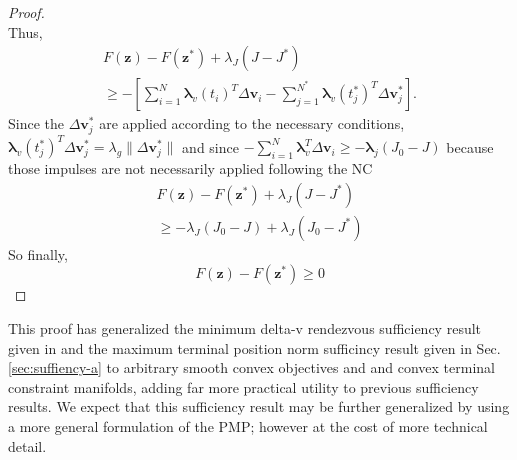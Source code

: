 \documentclass[letterpaper, 10 pt, conference]{ieeeconf}  %
\begin{document}
\begin{proof}
\[\]
Thus,
\begin{equation}
\begin{gathered}
F(\boldsymbol{z})-F(\boldsymbol{z}^*)+\lambda_J(J-J^*)\\
\geq-\left[\sum_{i=1}^{N}\boldsymbol{\lambda}_v(t_i)^T\Delta\boldsymbol{v}_i
-\sum_{j=1}^{N^*}\boldsymbol{\lambda}_v(t_j^*)^T\Delta\boldsymbol{v}_j^*\right].
\end{gathered}
\end{equation}
Since the $\Delta\boldsymbol{v}_j^*$ are applied according to the necessary conditions, $\boldsymbol{\lambda}_v(t_j^*)^T\Delta\boldsymbol{v}_j^* = \lambda_g\|\Delta\boldsymbol{v}_j^*\|$ and since $- \sum_{i=1}^N \boldsymbol{\lambda}_v^T \Delta \boldsymbol{v}_i \geq - \boldsymbol{\lambda}_j (J_0 - J)$ because those impulses are not necessarily applied following the NC
\begin{equation}
\begin{gathered}
F(\boldsymbol{z})-F(\boldsymbol{z}^*)+\lambda_J(J-J^*)\\
\geq-\lambda_J(J_0 - J)
+\lambda_J(J_0 - J^*)
\end{gathered}
\end{equation}
So finally, 
\[
F(\boldsymbol{z}) - F(\boldsymbol{z}^*) \geq 0
\]
\end{proof}
This proof has generalized the minimum delta-v rendezvous sufficiency result given in \cite{Prussing1995} and the maximum terminal position norm sufficincy result given in Sec. \ref{sec:suffiency-a} to arbitrary smooth convex objectives and and convex terminal constraint manifolds, adding far more practical utility to previous sufficiency results. We expect that this sufficiency result may be further generalized by using a more general formulation of the PMP; however at the cost of more technical detail. 
\end{document}
